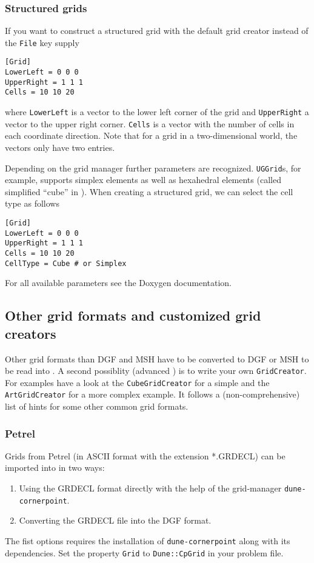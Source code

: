 \subsubsection{Structured grids}
If you want to construct a structured grid with the default grid creator instead of the \texttt{File} key supply
\begin{lstlisting}[style=DumuxParameterFile]
[Grid]
LowerLeft = 0 0 0
UpperRight = 1 1 1
Cells = 10 10 20
\end{lstlisting}
where \texttt{LowerLeft} is a vector to the lower left corner of the grid and \texttt{UpperRight} a vector to the upper right corner.
\texttt{Cells} is a vector with the number of cells in each coordinate direction. Note that for a grid in a two-dimensional world, the
vectors only have two entries.

Depending on the grid manager further parameters are recognized.
\texttt{UGGrid}s, for example, supports simplex elements as well as hexahedral elements
(called simplified ``cube'' in \Dune). When creating a structured grid, we can select the cell type as follows
\begin{lstlisting}[style=DumuxParameterFile]
[Grid]
LowerLeft = 0 0 0
UpperRight = 1 1 1
Cells = 10 10 20
CellType = Cube # or Simplex
\end{lstlisting}
For all available parameters see the Doxygen documentation.

\subsection{Other grid formats and customized grid creators}
Other grid formats than DGF and MSH have to be converted to DGF or MSH to be read into \Dumux. A second possiblity (advanced \Cplusplus) is to write your own
\texttt{GridCreator}. For examples have a look at the \texttt{CubeGridCreator} for a simple and the \texttt{ArtGridCreator} for a more complex example.
It follows a (non-comprehensive) list of hints for some other common grid formats.

\subsubsection{Petrel}
Grids from Petrel (in ASCII format with the extension *.GRDECL) can be imported into \Dumux in two ways:
  \begin{enumerate}
  \item Using the GRDECL format directly with the help of the grid-manager \texttt{dune-cornerpoint}.
  \item Converting the GRDECL file into the DGF format.
  \end{enumerate}
The fist options requires the installation of \texttt{dune-cornerpoint} along with its dependencies. Set the property \texttt{Grid} to \texttt{Dune::CpGrid} in your problem file.


